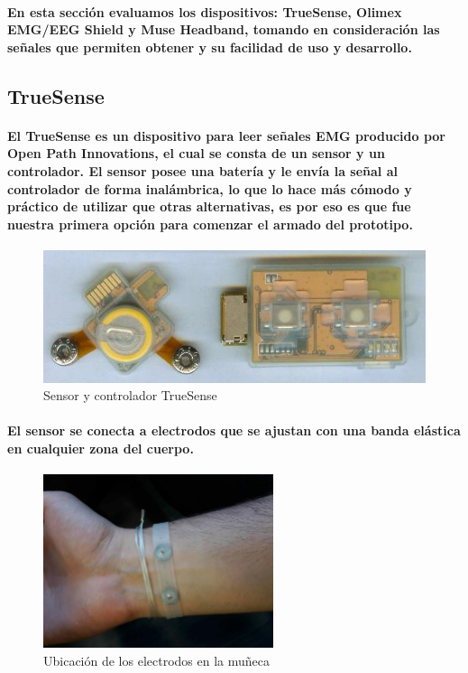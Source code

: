 \documentclass{article}
\begin{document}
\paragraph{
En esta sección evaluamos los dispositivos: TrueSense, Olimex EMG/EEG Shield y Muse Headband, tomando en consideración las señales que permiten obtener y su facilidad de uso y desarrollo.
}

\subsection{TrueSense}
\paragraph{
El TrueSense es un dispositivo para leer señales EMG producido por Open Path Innovations, el cual se consta de un sensor y un controlador. El sensor posee una batería y le envía la señal al controlador de forma inalámbrica, lo que lo hace más cómodo y práctico de utilizar que otras alternativas, es por eso es que fue nuestra primera opción para comenzar el armado del prototipo.
}

\begin{figure}[ht]
    \centering
    \includegraphics[scale=1]{truesense}
    \caption{Sensor y controlador TrueSense}
    \label{fig:truesense}
\end{figure}

\paragraph{
El sensor se conecta a electrodos que se ajustan con una banda elástica en cualquier zona del cuerpo.
}

\begin{figure}[ht]
    \centering
    \includegraphics[height=2in]{electrodo_munieca.png}%
    \caption{Ubicación de los electrodos en la muñeca}
    \label{fig:electrodos1}
\end{figure}
\end{document}
